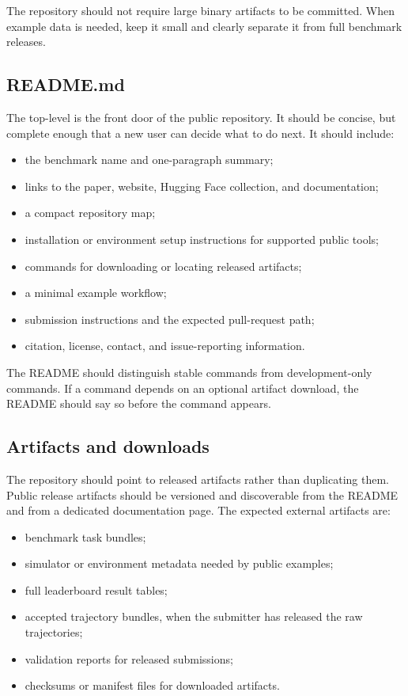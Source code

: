 \documentclass[11pt]{article}
\begin{document}
The repository should not require large binary artifacts to be committed.
When example data is needed, keep it small and clearly separate it from full benchmark releases.

\label{sec:public-repository-readme}
\subsection*{README.md}

The top-level  is the front door of the public repository.
It should be concise, but complete enough that a new user can decide what to do next.
It should include:

\begin{itemize}
\item the benchmark name and one-paragraph summary;
\item links to the paper, website, Hugging Face collection, and documentation;
\item a compact repository map;
\item installation or environment setup instructions for supported public tools;
\item commands for downloading or locating released artifacts;
\item a minimal example workflow;
\item submission instructions and the expected pull-request path;
\item citation, license, contact, and issue-reporting information.
\end{itemize}

The README should distinguish stable commands from development-only commands.
If a command depends on an optional artifact download, the README should say so before the command appears.

\label{sec:public-repository-artifacts}
\subsection*{Artifacts and downloads}

The repository should point to released artifacts rather than duplicating them.
Public release artifacts should be versioned and discoverable from the README and from a dedicated documentation page.
The expected external artifacts are:

\begin{itemize}
\item benchmark task bundles;
\item simulator or environment metadata needed by public examples;
\item full leaderboard result tables;
\item accepted trajectory bundles, when the submitter has released the raw trajectories;
\item validation reports for released submissions;
\item checksums or manifest files for downloaded artifacts.
\end{itemize}
\end{document}
